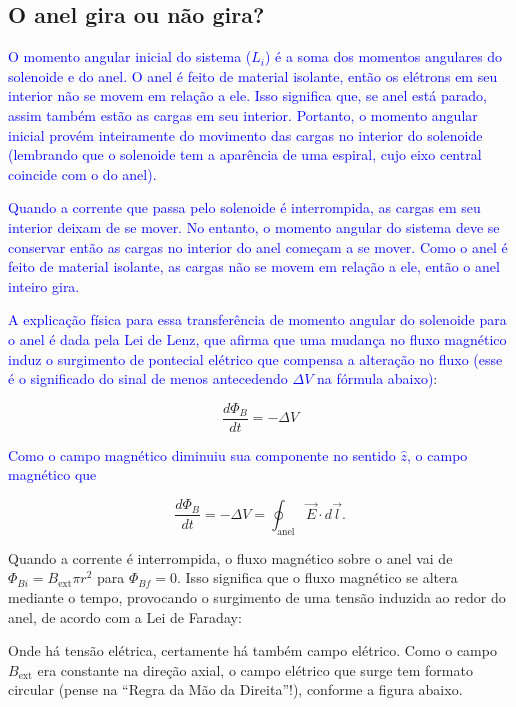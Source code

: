 \documentclass[
	article,
	11pt,
	oneside,
	a4paper,
	english,
	brazil,
	sumario=tradicional
	]{abntex2}
\begin{document}
\subsection{O anel gira ou não gira?}
\textcolor{blue}{O momento angular inicial do sistema ($L_i$) é a soma dos momentos angulares do solenoide e do anel. O anel é feito de material isolante, então os elétrons em seu interior não se movem em relação a ele. Isso significa que, se anel está parado, assim também estão as cargas em seu interior. Portanto, o momento angular inicial provém inteiramente do movimento das cargas no interior do solenoide (lembrando que o solenoide tem a aparência de uma espiral, cujo eixo central coincide com o do anel).}

\textcolor{blue}{Quando a corrente que passa pelo solenoide é interrompida, as cargas em seu interior deixam de se mover. No entanto, o momento angular do sistema deve se conservar então as cargas no interior do anel começam a se mover. Como o anel é feito de material isolante, as cargas não se movem em relação a ele, então o anel inteiro gira.}

\textcolor{blue}{A explicação física para essa transferência de momento angular do solenoide para o anel é dada pela Lei de Lenz, que afirma que uma mudança no fluxo magnético induz o surgimento de pontecial elétrico que compensa a alteração no fluxo (esse é o significado do sinal de menos antecedendo $\Delta V$ na fórmula abaixo)}:

\begin{equation}
	\frac{d\Phi_B}{dt} = -\Delta V
\end{equation}

\textcolor{blue}{Como o campo magnético diminuiu sua componente no sentido $\hat{z}$, o campo magnético que}

\begin{equation}
	\frac{d\Phi_B}{dt} = -\Delta V = \oint_{\text{anel}} \vec{E} \cdot d\vec{l}.
\end{equation}


Quando a corrente é interrompida, o fluxo magnético sobre o anel vai de $\Phi_{Bi} = B_{\text{ext}} \pi r^2$ para $\Phi_{Bf} = 0$. Isso significa que o fluxo magnético se altera mediante o tempo, provocando o surgimento de uma tensão induzida ao redor do anel, de acordo com a Lei de Faraday:


Onde há tensão elétrica, certamente há também campo elétrico. Como o campo $B_{\text{ext}}$ era constante na direção axial, o campo elétrico que surge tem formato circular (pense na ``Regra da Mão da Direita''!), conforme a figura abaixo.
\end{document}

